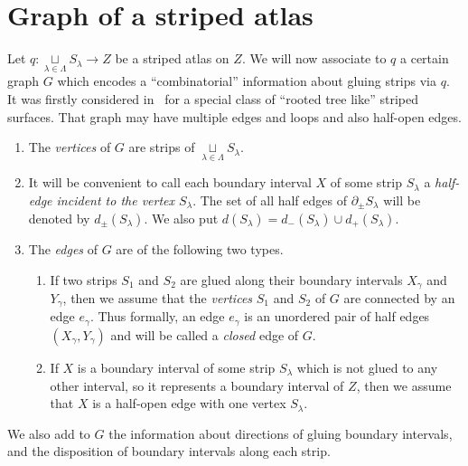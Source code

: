 \documentclass[12pt, reqno]{amsart}
\newcommand{\strip}{S}
\newcommand{\stripSurf}{Z}
\newcommand{\bdX}{X}
\newcommand{\bdY}{Y}
\newcommand{\stInd}{{\lambda}}
\newcommand{\StInd}{\Lambda}
\newcommand{\bdGlueInd}{{\gamma}}
\newcommand{\qmap}{q}
\newcommand\Gr{G}
\begin{document}
\section{Graph of a striped atlas}\label{sect:graph_of_a_striped_atlas}
Let $\qmap: \mathop{\sqcup}\limits_{\stInd\in\StInd}\strip_{\stInd} \to \stripSurf$ be a striped atlas on $\stripSurf$.
We will now associate to $\qmap$ a certain graph $\Gr$ which encodes a ``combinatorial'' information about gluing strips via $\qmap$.
It was firstly considered in~\cite{Soroka:MFAT:2016} for a special class of ``rooted tree like'' striped surfaces.
That graph may have multiple edges and loops and also half-open edges.
\begin{enumerate}[leftmargin=*]
\item 
The \textit{vertices} of $\Gr$ are strips of $\mathop{\sqcup}\limits_{\stInd\in\StInd}\strip_{\stInd}$.

\item 
It will be convenient to call each boundary interval $\bdX$ of some strip $\strip_{\stInd}$ a \textit{half-edge incident to the vertex $\strip_{\stInd}$}.
The set of all half edges of $\partial_{\pm}\strip_{\stInd}$ will be denoted by $d_{\pm}(\strip_{\stInd})$.
We also put $d(\strip_{\stInd})=d_{-}(\strip_{\stInd}) \cup d_{+}(\strip_{\stInd})$.

\item
The \textit{edges} of $\Gr$ are of the following two types.
\begin{enumerate}[leftmargin=*]
\item 
If two strips $\strip_1$ and $\strip_2$ are glued along their boundary intervals $\bdX_\bdGlueInd$ and $\bdY_\bdGlueInd$, then we assume that the \textit{vertices} $\strip_1$ and $\strip_2$ of $\Gr$ are connected by an edge $e_{\bdGlueInd}$.
Thus formally, an edge $e_{\bdGlueInd}$ is an unordered pair of half edges $(\bdX_\bdGlueInd, \bdY_\bdGlueInd)$ and will be called a \textit{closed} edge of $\Gr$.

\item
If $\bdX$ is a boundary interval of some strip $\strip_{\stInd}$ which is not glued to any other interval, so it represents a boundary interval of $\stripSurf$, then we assume that $\bdX$ is a half-open edge with one vertex $\strip_{\stInd}$.
\end{enumerate}
\end{enumerate}

We also add to $\Gr$ the information about directions of gluing boundary intervals, and the disposition of boundary intervals along each strip.
\end{document}
